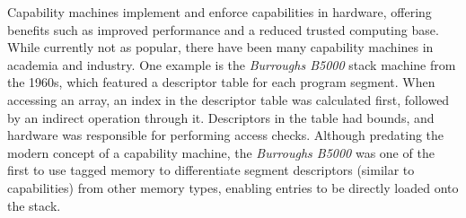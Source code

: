 Capability machines implement and enforce capabilities in hardware, 
offering benefits such as improved performance and a reduced trusted 
computing base. While currently not as popular, there have been many 
capability machines in academia and industry. One example is the \textit{Burroughs B5000}\cite{noauthor_architecture_nodate} 
stack machine from the 1960s, which featured a descriptor table for each program segment. 
When accessing an array, an index in the descriptor table was calculated first, 
followed by an indirect operation through it. Descriptors in the table had bounds,
 and hardware was responsible for performing access checks. Although predating the 
 modern concept of a capability machine, the \textit{Burroughs B5000} was one of the first 
 to use tagged memory to differentiate segment descriptors (similar to capabilities) 
 from other memory types, enabling entries to be directly loaded onto the stack.
 \newline



